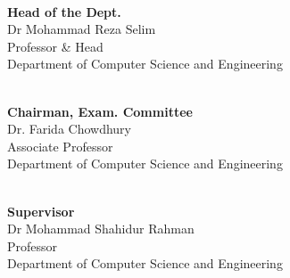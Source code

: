 \documentclass{standalone}
\begin{document}
\begin{titlepage}
\begin{multicols}{3}
				\begin{flushleft}
				\hrulefill \\
				{\bf \small \hspace{0.5mm}Head of the Dept.}\\Dr Mohammad Reza Selim\\Professor \& Head\\ Department of Computer Science and Engineering\\
				\end{flushleft}
				
				\begin{flushleft}
				\hrulefill \\
					{\bf \small \hspace{0.5mm} Chairman, Exam. Committee }\\Dr. Farida Chowdhury
\\Associate Professor\\ Department of Computer Science and Engineering\\%
				\end{flushleft}
				
				\begin{flushleft}
				\hrulefill \\
					{\bf Supervisor}\\Dr Mohammad Shahidur Rahman \\Professor\\ Department of Computer Science and Engineering\\
				\end{flushleft}
				\end{multicols}
\end{titlepage}
\end{document}

